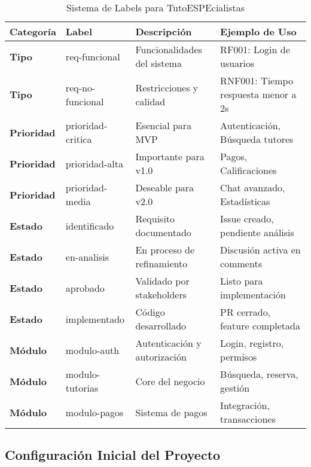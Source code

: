 \documentclass[12pt,a4paper]{article}
\begin{document}
\begin{table}[H]
\centering
\caption{Sistema de Labels para TutoESPEcialistas}
\begin{tabular}{|p{3cm}|p{3.5cm}|p{4cm}|p{4cm}|}
\hline
\rowcolor{headercolor!30}
\textbf{\color{white}Categoría} & 
\textbf{\color{white}Label} & 
\textbf{\color{white}Descripción} & 
\textbf{\color{white}Ejemplo de Uso} \\
\hline
\textbf{Tipo} & req-funcional & Funcionalidades del sistema & RF001: Login de usuarios \\
\hline
\textbf{Tipo} & req-no-funcional & Restricciones y calidad & RNF001: Tiempo respuesta menor a 2s \\
\hline
\textbf{Prioridad} & prioridad-critica & Esencial para MVP & Autenticación, Búsqueda tutores \\
\hline
\textbf{Prioridad} & prioridad-alta & Importante para v1.0 & Pagos, Calificaciones \\
\hline
\textbf{Prioridad} & prioridad-media & Deseable para v2.0 & Chat avanzado, Estadísticas \\
\hline
\textbf{Estado} & identificado & Requisito documentado & Issue creado, pendiente análisis \\
\hline
\textbf{Estado} & en-analisis & En proceso de refinamiento & Discusión activa en comments \\
\hline
\textbf{Estado} & aprobado & Validado por stakeholders & Listo para implementación \\
\hline
\textbf{Estado} & implementado & Código desarrollado & PR cerrado, feature completada \\
\hline
\textbf{Módulo} & modulo-auth & Autenticación y autorización & Login, registro, permisos \\
\hline
\textbf{Módulo} & modulo-tutorias & Core del negocio & Búsqueda, reserva, gestión \\
\hline
\textbf{Módulo} & modulo-pagos & Sistema de pagos & Integración, transacciones \\
\hline
\end{tabular}
\end{table}

\subsection{Configuración Inicial del Proyecto}
\end{document}
